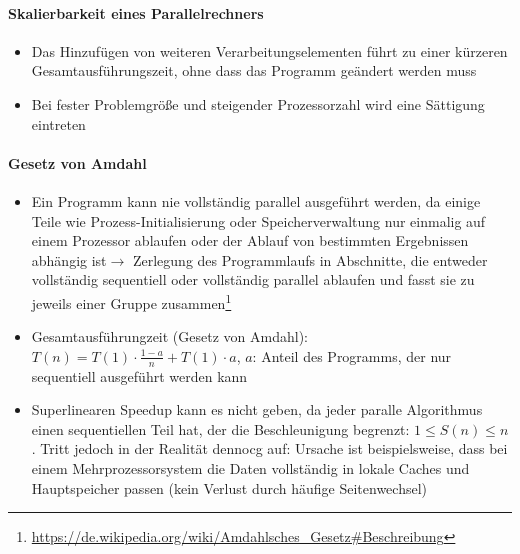 	\paragraph{Skalierbarkeit eines Parallelrechners}
		\begin{itemize}
			\item Das Hinzufügen von weiteren Verarbeitungselementen führt zu einer kürzeren Gesamtausführungszeit, ohne dass das Programm geändert werden muss
			\item Bei fester Problemgröße und steigender Prozessorzahl wird eine Sättigung eintreten
		\end{itemize}

	\paragraph{Gesetz von Amdahl}
		\begin{itemize}
			\item Ein Programm kann nie vollständig parallel ausgeführt werden, da einige Teile wie Prozess-Initialisierung oder Speicherverwaltung nur einmalig auf einem Prozessor ablaufen oder der Ablauf von bestimmten Ergebnissen abhängig ist\(\rightarrow\) Zerlegung des Programmlaufs in Abschnitte, die entweder vollständig sequentiell oder vollständig parallel ablaufen und fasst sie zu jeweils einer Gruppe zusammen\footnote{\url{https://de.wikipedia.org/wiki/Amdahlsches_Gesetz\#Beschreibung}}
			\item Gesamtausführungzeit (Gesetz von Amdahl): \(T(n) = T(1) \cdot \frac{1-a}{n} + T(1) \cdot a\), \(a\): Anteil des Programms, der nur sequentiell ausgeführt werden kann
			\item Superlinearen Speedup kann es nicht geben, da jeder paralle Algorithmus einen sequentiellen Teil hat, der die Beschleunigung begrenzt: \(1 \le S(n) \le n\). Tritt jedoch in der Realität dennocg auf: Ursache ist beispielsweise, dass bei einem Mehrprozessorsystem die Daten vollständig in lokale Caches und Hauptspeicher passen (kein Verlust durch häufige Seitenwechsel)
		\end{itemize}


